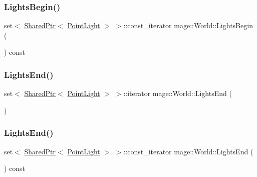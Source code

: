 \hypertarget{classmage_1_1_world_a45b3876de39fd5d7bd176f029cf4c535}{}\label{classmage_1_1_world_a45b3876de39fd5d7bd176f029cf4c535} 
\subsubsection{\texorpdfstring{Lights\+Begin()}{LightsBegin()}\hspace{0.1cm}{\footnotesize\ttfamily [2/2]}}
{\footnotesize\ttfamily set$<$ \hyperlink{namespacemage_a1e01ae66713838a7a67d30e44c67703e}{Shared\+Ptr}$<$ \hyperlink{classmage_1_1_point_light}{Point\+Light} $>$ $>$\+::const\+\_\+iterator mage\+::\+World\+::\+Lights\+Begin (\begin{DoxyParamCaption}{ }\end{DoxyParamCaption}) const}

\hypertarget{classmage_1_1_world_a52c035bf11269bb9cc6fb537532bfeab}{}\label{classmage_1_1_world_a52c035bf11269bb9cc6fb537532bfeab} 
\subsubsection{\texorpdfstring{Lights\+End()}{LightsEnd()}\hspace{0.1cm}{\footnotesize\ttfamily [1/2]}}
{\footnotesize\ttfamily set$<$ \hyperlink{namespacemage_a1e01ae66713838a7a67d30e44c67703e}{Shared\+Ptr}$<$ \hyperlink{classmage_1_1_point_light}{Point\+Light} $>$ $>$\+::iterator mage\+::\+World\+::\+Lights\+End (\begin{DoxyParamCaption}{ }\end{DoxyParamCaption})}

\hypertarget{classmage_1_1_world_a752ce259cdcffdfba51e2c9e480d2ddc}{}\label{classmage_1_1_world_a752ce259cdcffdfba51e2c9e480d2ddc} 
\subsubsection{\texorpdfstring{Lights\+End()}{LightsEnd()}\hspace{0.1cm}{\footnotesize\ttfamily [2/2]}}
{\footnotesize\ttfamily set$<$ \hyperlink{namespacemage_a1e01ae66713838a7a67d30e44c67703e}{Shared\+Ptr}$<$ \hyperlink{classmage_1_1_point_light}{Point\+Light} $>$ $>$\+::const\+\_\+iterator mage\+::\+World\+::\+Lights\+End (\begin{DoxyParamCaption}{ }\end{DoxyParamCaption}) const}


